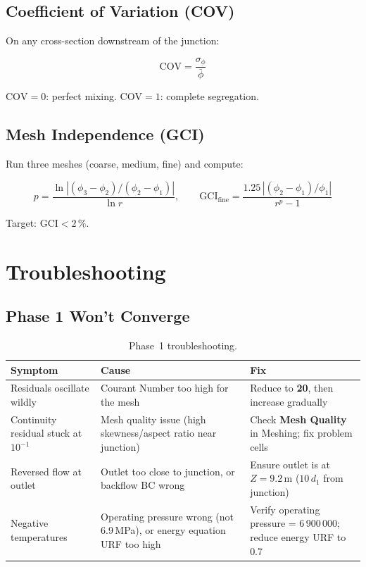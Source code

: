 \documentclass[12pt,a4paper]{report}
\begin{document}
\section{Coefficient of Variation (COV)}

On any cross-section downstream of the junction:

\[
  \text{COV} = \frac{\sigma_{\phi}}{\bar{\phi}}
\]

\noindent $\text{COV} = 0$: perfect mixing.
$\text{COV} = 1$: complete segregation.


\section{Mesh Independence (GCI)}

Run three meshes (coarse, medium, fine) and compute:

\[
  p = \frac{\ln|(\phi_3 - \phi_2)/(\phi_2 - \phi_1)|}{\ln r},
  \qquad
  \text{GCI}_{\text{fine}}
  = \frac{1.25\,|(\phi_2 - \phi_1)/\phi_1|}{r^p - 1}
\]

\noindent Target: $\text{GCI} < 2\,\%$.


\chapter{Troubleshooting}
\label{ch:trouble}

\section{Phase 1 Won't Converge}

\begin{table}[H]
\centering
\caption{Phase~1 troubleshooting.}
\begin{tabularx}{\textwidth}{@{}lXX@{}}
\toprule
\textbf{Symptom} & \textbf{Cause} & \textbf{Fix} \\
\midrule
Residuals oscillate wildly &
  Courant Number too high for the mesh &
  Reduce to \textbf{20}, then increase gradually \\
Continuity residual stuck at $10^{-1}$ &
  Mesh quality issue (high skewness/aspect ratio near junction) &
  Check \textbf{Mesh Quality} in Meshing; fix problem cells \\
Reversed flow at outlet &
  Outlet too close to junction, or backflow BC wrong &
  Ensure outlet is at $Z = 9.2$\,m ($10\,d_1$ from junction) \\
Negative temperatures &
  Operating pressure wrong (not 6.9\,MPa), or energy equation URF
  too high &
  Verify operating pressure = 6\,900\,000; reduce energy URF to 0.7 \\
\bottomrule
\end{tabularx}
\end{table}
\end{document}
